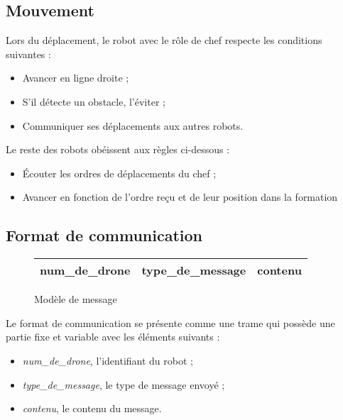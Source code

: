 \documentclass[a4paper,12pt]{article}
\begin{document}
\subsection{Mouvement}
Lors du déplacement, le robot avec le rôle de chef respecte les conditions suivantes :
\begin{itemize}
        \item Avancer en ligne droite ;
        \item S'il détecte un obstacle, l'éviter ;
        \item Communiquer ses déplacements aux autres robots.
\end{itemize}
Le reste des robots obéissent aux règles ci-dessous :
\begin{itemize}
        \item Écouter les ordres de déplacements du chef ;
        \item Avancer en fonction de l'ordre reçu et de leur position dans la formation
\end{itemize}

\subsection{Format de communication}

\begin{figure}[!h]
        \centering
        \begin{tabular}{|l|l|l|}
                \hline
                num\_de\_drone & type\_de\_message & contenu \\ \hline
        \end{tabular}
        \caption{Modèle de message}\label{fig:Mesg}
\end{figure}
Le format de communication se présente comme une trame qui possède une partie fixe et variable avec les éléments suivants :
\begin{itemize}
        \item \textit{num\_de\_drone}, l'identifiant du robot ;
        \item  \textit{type\_de\_message}, le type de message envoyé ;
\item \textit{contenu}, le contenu du message.
\end{itemize}

\newpage
\end{document}
